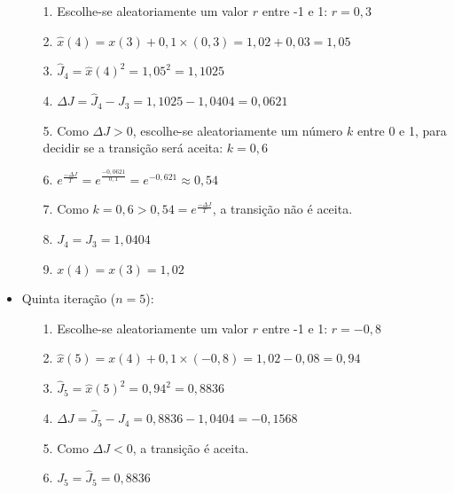 \documentclass{report}
\begin{document}
\begin{itemize}
\begin{itemize}

\item[1.] Escolhe-se aleatoriamente um valor $r$ entre -1 e 1: $r = 0,3$

\item[2.] $\hat{x}(4) = x(3) + 0,1 \times (0,3) = 1,02 + 0,03 = 1,05$

\item[3.] $\hat{J}_{4} = \hat{x}(4)^2 = 1,05^2 = 1,1025$

\item[4.] $\Delta J = \hat{J}_{4} - J_{3} = 1,1025 - 1,0404 = 0,0621$

\item[5.] Como $\Delta J > 0$, escolhe-se aleatoriamente um número $k$ entre 0 e 1, para decidir se a transição será aceita: $k = 0,6$

\item[6.] $e^{\frac{- \Delta J}{T}} = e^{\frac{- 0,0621}{0,1}} = e^{-0,621} \approx 0,54$

\item[7.] Como $k = 0,6 > 0,54 = e^{\frac{- \Delta J}{T}}$, a transição não é aceita.

\item[8.] $J_{4} = J_{3} = 1,0404$

\item[9.] $x(4) = x(3) = 1,02$

\end{itemize}

\item Quinta iteração ($n = 5$):

\begin{itemize}

\item[1.] Escolhe-se aleatoriamente um valor $r$ entre -1 e 1: $r = -0,8$

\item[2.] $\hat{x}(5) = x(4) + 0,1 \times (-0,8) = 1,02 - 0,08 = 0,94$

\item[3.] $\hat{J}_{5} = \hat{x}(5)^2 = 0,94^2 = 0,8836$

\item[4.] $\Delta J = \hat{J}_{5} - J_{4} = 0,8836 - 1,0404 = -0,1568$

\item[5.] Como $\Delta J < 0$, a transição é aceita.

\item[6.] $J_{5} = \hat{J}_{5} = 0,8836$


\end{itemize}
\end{itemize}
\end{document}
